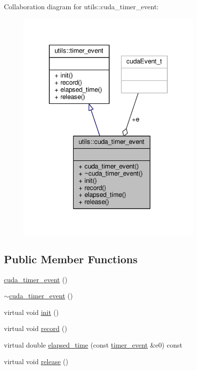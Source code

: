 Collaboration diagram for utils\-:\-:cuda\-\_\-timer\-\_\-event\-:\nopagebreak
\begin{figure}[H]
\begin{center}
\leavevmode
\includegraphics[width=261pt]{structutils_1_1cuda__timer__event__coll__graph}
\end{center}
\end{figure}
\subsection*{Public Member Functions}
\begin{DoxyCompactItemize}
\item 
\hyperlink{structutils_1_1cuda__timer__event_ac337469a341c5862d300a7d0463cda4b}{cuda\-\_\-timer\-\_\-event} ()
\item 
\hyperlink{structutils_1_1cuda__timer__event_abf0601e8e9d78d34e0303173fee3a227}{$\sim$cuda\-\_\-timer\-\_\-event} ()
\item 
virtual void \hyperlink{structutils_1_1cuda__timer__event_a206eb2f8719df4fa1edcfbfec1ea2c18}{init} ()
\item 
virtual void \hyperlink{structutils_1_1cuda__timer__event_ad7f15ec799ca3909ade273e981bfcc3b}{record} ()
\item 
virtual double \hyperlink{structutils_1_1cuda__timer__event_ae3159d8c207abe1cfbda76215d501a89}{elapsed\-\_\-time} (const \hyperlink{structutils_1_1timer__event}{timer\-\_\-event} \&e0) const 
\item 
virtual void \hyperlink{structutils_1_1cuda__timer__event_a2a2ec069b6be6608afe50f6762f26810}{release} ()
\end{DoxyCompactItemize}
